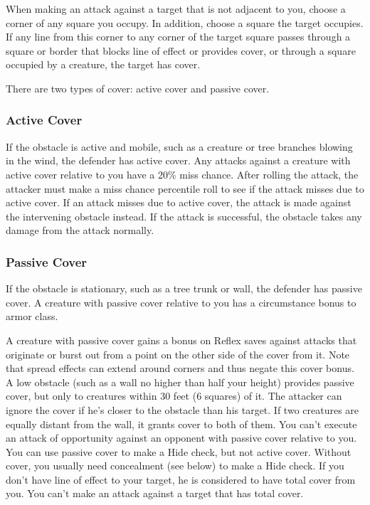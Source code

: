 When making an attack against a target that is not adjacent to you, choose a corner of any square you occupy. In addition, choose a square the target occupies. If any line from this corner to any corner of the target square passes through a square or border that blocks line of effect or provides cover, or through a square occupied by a creature, the target has cover.

There are two types of cover: active cover and passive cover.

\subsubsection{Active Cover}

If the obstacle is active and mobile, such as a creature or tree branches blowing in the wind, the defender has active cover. Any attacks against a creature with active cover relative to you have a 20\% miss chance. After rolling the attack, the attacker must make a miss chance percentile roll to see if the attack misses due to active cover. If an attack misses due to active cover, the attack is made against the intervening obstacle instead. If the attack is successful, the obstacle takes any damage from the attack normally. 

\subsubsection{Passive Cover}

If the obstacle is stationary, such as a tree trunk or wall, the defender has passive cover. A creature with passive cover relative to you has a  circumstance bonus to armor class.

 A creature with passive cover gains a  bonus on Reflex saves against attacks that originate or burst out from a point on the other side of the cover from it. Note that spread effects can extend around corners and thus negate this cover bonus.
 A low obstacle (such as a wall no higher than half your height) provides passive cover, but only to creatures within 30 feet (6 squares) of it. The attacker can ignore the cover if he's closer to the obstacle than his target. If two creatures are equally distant from the wall, it grants cover to both of them.
 You can't execute an attack of opportunity against an opponent with passive cover relative to you.
 You can use passive cover to make a Hide check, but not active cover. Without cover, you usually need concealment (see below) to make a Hide check.
 If you don't have line of effect to your target, he is considered to have total cover from you. You can't make an attack against a target that has total cover.

